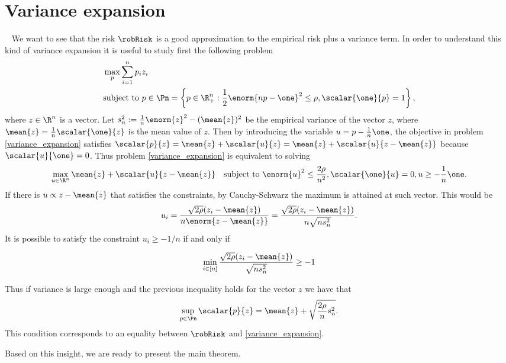 \section{Variance expansion}~\label{sec:var_expansion}
We want to see that the risk $\robRisk$ is a good approximation to the empirical risk plus a variance term. In order to understand this kind of variance expansion it is useful to study first the following problem
\begin{align}\label{variance_expansion}
	\begin{aligned}
         &\max_{p} \sum_{i=1}^n p_i z_i \\
         &\text{subject to } p \in \Pn = \left\{p\in \R_+^n : \frac{1}{2} \enorm{np-\one}^2 \leq \rho, \scalar{\one}{p} = 1\right\},
	\end{aligned}
\end{align}
where $z \in \R^n$ is a vector. Let $s_n^2 := \frac{1}{n} \enorm{z}^2 - (\mean{z})^2 $ be the empirical variance of the vector $z$, where $\mean{z} = \frac{1}{n} \scalar{\one}{z}$ is the mean value of $z$. Then by introducing the variable $u=p-\frac{1}{n} \one$, the objective in problem \eqref{variance_expansion} satisfies $\scalar{p}{z} = \mean{z} + \scalar{u}{z} = \mean{z} + \scalar{u}{z-\mean{z}}$ because $\scalar{u}{\one}=0$. Thus problem \eqref{variance_expansion} is equivalent to solving
\[
    \max_{u \in \R^n} \mean{z} + \scalar{u}{z-\mean{z}} \quad \text{subject to } \enorm{u}^2 \leq \frac{2\rho}{n^2}, \scalar{\one}{u} = 0, u \geq -\frac{1}{n}\one.
\]
If there is $u \propto z-\mean{z}$ that satisfies the constraints, by Cauchy-Schwarz the maximum is attained at such vector. This would be
\[
    u_i = \frac{\sqrt{2\rho}(z_i -\mean{z})}{n\enorm{z-\mean{z}}} = \frac{\sqrt{2\rho} (z_i -\mean{z})}{n\sqrt{ns^2_n}}.
\]
It is possible to satisfy the constraint $u_i \geq -1/n$  if and only if

  \begin{align}
    \min_{i\in [n]} \frac{\sqrt{2\rho}(z_i - \mean{z})}{\sqrt{ns_n^2}}
    \geq -1\label{eq:cond_u}
  \end{align}

Thus if variance is large enough and the previous inequality holds for the vector $z$ we have that
\[
    \sup_{p\in\Pn} \scalar{p}{z} = \mean{z} + \sqrt{\frac{2\rho}{n} s_n^2}.
\]
This condition corresponds to an equality between $\robRisk$ and \eqref{variance_expansion}.

Based on this insight, we are ready to present the main theorem.

